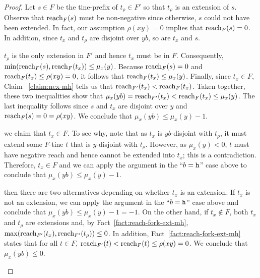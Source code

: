 \begin{proof}
    Let $s \in F$ be the tine-prefix of $t_\rho \in F'$ so that 
    $t_\rho$ is an extension of $s$. 
    Observe that $\operatorname{reach}_F(s)$ must be non-negative since 
    otherwise, $s$ could not have been extended. 
    In fact, our assumption $\rho(xy)=0$ implies that 
    $\operatorname{reach}_F(s) = 0$. 
    In addition, since $t_x$ and $t_\rho$ are disjoint over $yb$, 
    so are $t_x$ and $s$. 
    \begin{description}[font=\normalfont\itshape\space]
      \item[If $b = \h$,] 
      $t_\rho$ is the only extension in $F'$ and hence 
      $t_x$ must be in $F$. 
      Consequently, \\      
      $\min( \operatorname{reach}_F(s),\operatorname{reach}_F(t_x) ) \leq \mu_x(y)$. 
      Because $\operatorname{reach}_F(s)=0$ and $\operatorname{reach}_F(t_x) \leq \rho(xy)=0$, it follows that $\operatorname{reach}_F(t_x) \leq \mu_x(y)$. 
      Finally, since $t_x \in F$, 
      Claim ~\ref{claim:nex-mh} tells us that 
      $\operatorname{reach}_{F'}(t_x) < \operatorname{reach}_F(t_x)$. 
      Taken together, these two inequalities show that 
      $\mu_x(yb) = \operatorname{reach}_{F'}(t_x) < \operatorname{reach}_F(t_x) \leq \mu_x(y)$. 
      The last inequality follows since $s$ and $t_x$ are disjoint over $y$ and $\operatorname{reach}_F(s) = 0 = \rho(xy)$. 
      We conclude that $\mu_x(yb) \leq \mu_x(y) - 1$.

      \item[If $b = \H$ and $\mu_x(y) < 0$,] 
      we claim that $t_x \in F$. 
      To see why, note that as $t_x$ is $yb$-disjoint with $t_\rho$, 
      it must extend some $F$-tine $t$ that is $y$-disjoint with $t_\rho$. 
      However, as $\mu_x(y) < 0$, $t$ must have negative reach and hence cannot be extended into $t_x$; this is a contradiction. 
      Therefore, $t_x \in F$ and we can apply the argument in the ``$b = \h$'' case above 
      to conclude that $\mu_x(yb) \leq \mu_x(y) - 1$.

      \item[If $b = \H$ and $\mu_x(y) = 0$,] 
      then there are two alternatives depending on 
      whether $t_x$ is an extension. 
      If $t_x$ is not an extension, we can apply the argument in the ``$b = \h$'' case above and conclude that 
      $\mu_x(yb) \leq \mu_x(y) - 1 = -1$.
      On the other hand, if $t_x \not\in F$, 
      both $t_x$ and $t_\rho$ are extensions and, 
      by Fact~\ref{fact:reach-fork-ext-mh}, 
      $\max(\operatorname{reach}_{F'}(t_x), \operatorname{reach}_{F'}(t_\rho) ) \leq 0$. 
      In addition, Fact~\ref{fact:reach-fork-ext-mh} states that for all $t \in F$, 
      $\operatorname{reach}_{F'}(t) < \operatorname{reach}_{F}(t) \leq \rho(xy) = 0$. 
      We conclude that $\mu_x(yb) \leq 0$.


\end{description}
\end{proof}
